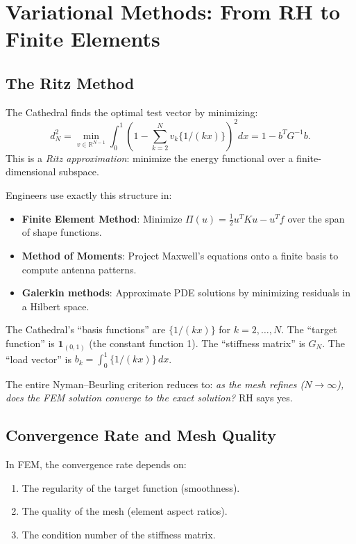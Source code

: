 \documentclass[11pt,a4paper]{article}
\newcommand{\RH}{\ensuremath{\mathrm{RH}}}
\begin{document}
\section{Variational Methods: From RH to Finite Elements}
\label{sec:fem}

\subsection{The Ritz Method}

The Cathedral finds the optimal test vector by minimizing:
\[
  d_N^2 = \min_{v \in \mathbb{R}^{N-1}}
  \int_0^1 \left(1 - \sum_{k=2}^N v_k \{1/(kx)\}\right)^2 dx
  = 1 - b^T G^{-1} b.
\]
This is a \emph{Ritz approximation}: minimize the energy functional
over a finite-dimensional subspace.

Engineers use exactly this structure in:

\begin{itemize}
  \item \textbf{Finite Element Method}: Minimize
    $\Pi(u) = \frac{1}{2} u^T K u - u^T f$ over the span of shape
    functions.
  \item \textbf{Method of Moments}: Project Maxwell's equations
    onto a finite basis to compute antenna patterns.
  \item \textbf{Galerkin methods}: Approximate PDE solutions by
    minimizing residuals in a Hilbert space.
\end{itemize}

The Cathedral's ``basis functions'' are $\{1/(kx)\}$ for
$k = 2, \ldots, N$. The ``target function'' is $\mathbf{1}_{(0,1)}$
(the constant function 1). The ``stiffness matrix'' is $G_N$. The
``load vector'' is $b_k = \int_0^1 \{1/(kx)\}\,dx$.

The entire Nyman--Beurling criterion reduces to: \emph{as the mesh
refines ($N \to \infty$), does the FEM solution converge to the
exact solution?} \RH{} says yes.

\subsection{Convergence Rate and Mesh Quality}

In FEM, the convergence rate depends on:
\begin{enumerate}
  \item The regularity of the target function (smoothness).
  \item The quality of the mesh (element aspect ratios).
  \item The condition number of the stiffness matrix.
\end{enumerate}
\end{document}
